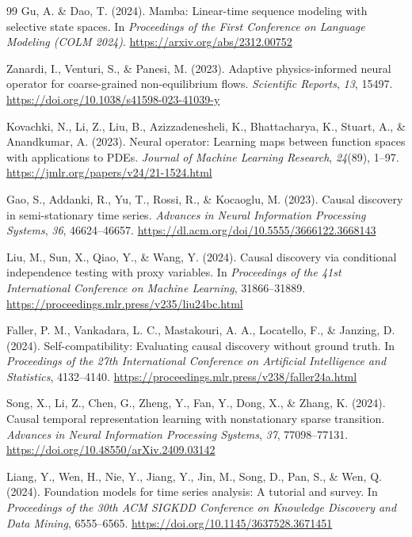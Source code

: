 \begin{thebibliography}{99}
 Gu, A. \& Dao, T. (2024). Mamba: Linear-time sequence modeling with selective state spaces. In \textit{Proceedings of the First Conference on Language Modeling (COLM 2024)}. \url{https://arxiv.org/abs/2312.00752}

 Zanardi, I., Venturi, S., \& Panesi, M. (2023). Adaptive physics-informed neural operator for coarse-grained non-equilibrium flows. \textit{Scientific Reports}, \textit{13}, 15497. \url{https://doi.org/10.1038/s41598-023-41039-y}

 Kovachki, N., Li, Z., Liu, B., Azizzadenesheli, K., Bhattacharya, K., Stuart, A., \& Anandkumar, A. (2023). Neural operator: Learning maps between function spaces with applications to PDEs. \textit{Journal of Machine Learning Research}, \textit{24}(89), 1--97. \url{https://jmlr.org/papers/v24/21-1524.html}

 Gao, S., Addanki, R., Yu, T., Rossi, R., \& Kocaoglu, M. (2023). Causal discovery in semi-stationary time series. \textit{Advances in Neural Information Processing Systems}, \textit{36}, 46624--46657. \url{https://dl.acm.org/doi/10.5555/3666122.3668143}

 Liu, M., Sun, X., Qiao, Y., \& Wang, Y. (2024). Causal discovery via conditional independence testing with proxy variables. In \textit{Proceedings of the 41st International Conference on Machine Learning}, 31866--31889. \url{https://proceedings.mlr.press/v235/liu24bc.html}

 Faller, P. M., Vankadara, L. C., Mastakouri, A. A., Locatello, F., \& Janzing, D. (2024). Self-compatibility: Evaluating causal discovery without ground truth. In \textit{Proceedings of the 27th International Conference on Artificial Intelligence and Statistics}, 4132--4140. \url{https://proceedings.mlr.press/v238/faller24a.html}

 Song, X., Li, Z., Chen, G., Zheng, Y., Fan, Y., Dong, X., \& Zhang, K. (2024). Causal temporal representation learning with nonstationary sparse transition. \textit{Advances in Neural Information Processing Systems}, \textit{37}, 77098--77131. \url{https://doi.org/10.48550/arXiv.2409.03142}

 Liang, Y., Wen, H., Nie, Y., Jiang, Y., Jin, M., Song, D., Pan, S., \& Wen, Q. (2024). Foundation models for time series analysis: A tutorial and survey. In \textit{Proceedings of the 30th ACM SIGKDD Conference on Knowledge Discovery and Data Mining}, 6555--6565. \url{https://doi.org/10.1145/3637528.3671451}


\end{thebibliography}
